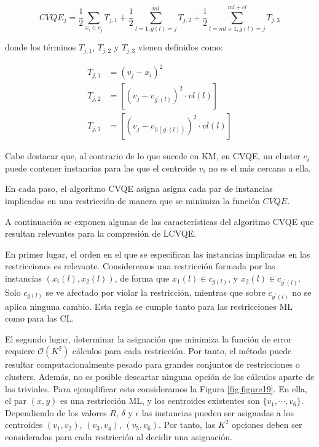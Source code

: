 \begin{equation}
CVQE_j = \frac{1}{2} \sum_{x_i \in c_j} T_{j,1} + 
\frac{1}{2} \sum_{l=1,g(l) = j}^{ml} T_{j,2} + 
\frac{1}{2} \sum_{l=ml + 1,g(l) = j}^{ml + cl} T_{j,3}
\label{eqn32}
\end{equation}

donde los términos $T_{j,1}$, $T_{j,2}$ y $T_{j,3}$ vienen definidos como: 

\begin{equation}
\begin{split}
T_{j,1} &= (v_j - x_i)^2\\
T_{j,2} &= \left[ (v_j - v_{g^\prime(l)})^2 \cdot vl(l) \right]\\
T_{j,3} &= \left[ (v_j - v_{h(g^\prime(l))})^2 \cdot vl(l) \right]
\end{split}
\label{eqn33}
\end{equation}

Cabe destacar que, al contrario de lo que sucede en \acf{KM}, en \acs{CVQE}, un cluster $c_i$ puede contener instancias para las que el centroide $v_i$ no es el más cercano a ella.

En cada paso, el algoritmo \acs{CVQE} asigna asigna cada par de instancias implicadas en una restricción de manera que se minimiza la función $CVQE$.

A continuación se exponen algunas de las características del algoritmo \acs{CVQE} que resultan relevantes para la compresión de \acs{LCVQE}.

En primer lugar, el orden en el que se especifican las instancias implicadas en las restricciones es relevante. Consideremos una restricción formada por las instancias $(x_i(l), x_2(l))$, de forma que $x_1(l) \in c_{g(l)}$, y $x_2(l) \in c_{g^\prime(l)}$. Solo $c_{g(l)}$ se ve afectado por violar la restricción, mientras que sobre $c_{g^\prime(l)}$ no se aplica ninguna cambio. Esta regla se cumple tanto para las restricciones \acf{ML} como para las \acf{CL}.

El segundo lugar, determinar la asignación que minimiza la función de error requiere $\mathcal{O}(K^2)$ cálculos para cada restricción. Por tanto, el método puede resultar computacionalmente pesado para grandes conjuntos de restricciones o clusters. Además, no es posible descartar ninguna opción de los cálculos aparte de las triviales. Para ejemplificar esto consideramos la Figura \ref{fig:figure19}. En ella, el par $(x,y)$ es una restricción \acs{ML}, y los centroides existentes son $\{v_1,\cdots,v_6\}$. Dependiendo de los valores $R$, $\delta$ y $\epsilon$ las instancias pueden ser asignadas a los centroides $(v_1, v_2)$, $(v_3, v_4)$, $(v_5, v_6)$. Por tanto, las $K^2$ opciones deben ser consideradas para cada restricción al decidir una asignación.


